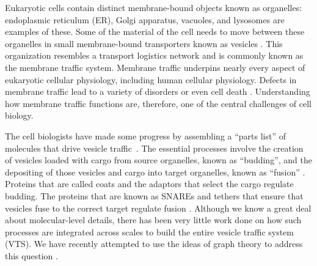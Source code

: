 \noindent 
Eukaryotic cells contain distinct membrane-bound objects known as organelles: endoplasmic reticulum (ER), Golgi apparatus, vacuoles, and lysosomes are examples of these.
%
%
%
%
%
%
Some of the material of the cell needs to move
between these organelles in small membrane-bound
transporters known as vesicles \cite{stenmark2009rab}.
%
This organization resembles a transport logistics network
and is commonly known as the membrane traffic system.
%
Membrane traffic underpins nearly every aspect of eukaryotic cellular
physiology, including human cellular physiology.
%
Defects in membrane traffic lead to a variety of disorders or even
cell death \cite{stenmark2009rab}.
%
Understanding how membrane traffic functions are, therefore, one of the
central challenges of cell biology.
%

The cell biologists have made some progress by assembling a
“parts list” of molecules that drive vesicle
traffic~\cite{dacks2007evolution}.
%
The essential processes involve the creation of vesicles loaded with
cargo from source organelles, known as “budding”, and the depositing
of those vesicles and cargo into target organelles, known as “fusion”
\cite{munro2004organelle}.
%
Proteins that are called coats and the adaptors that select the cargo regulate budding.
%
The proteins that are known as SNAREs and tethers that ensure that vesicles
fuse to the correct target regulate fusion
\cite{mani2016stacking}.
%
Although we know a great deal about molecular-level details, there has
been very little work done on how such processes are integrated across
scales to build the entire vesicle traffic system (VTS).
%
We have recently attempted to use the ideas of graph theory to address
this question \cite{mani2016stacking,shukla2017discovering}.

